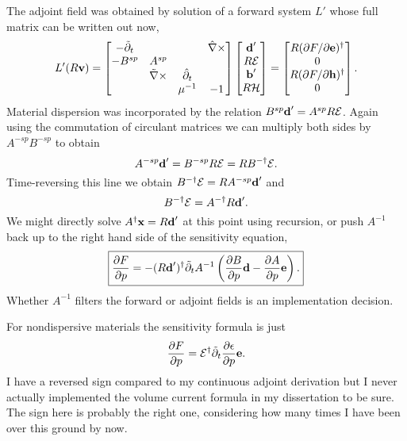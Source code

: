The adjoint field was obtained by solution of a forward system $L'$ whose full matrix can be written out now,
%
\begin{equation}
L'(R \textbf{v}) =
\begin{bmatrix}
-\tilde{\partial}_t & & & \hat{\nabla} \times \\
-B^{sp} & A^{sp} & & \\
& \tilde{\nabla} \times & \hat{\partial}_t & \\
& & \mu^{-1} & -1
\end{bmatrix}
\begin{bmatrix}
\textbf{d}' \\ R \mathcal{E} \\ \textbf{b}' \\ R \mathcal{H}
\end{bmatrix}
=
\begin{bmatrix}
R(\partial{F}/\partial{\textbf{e}})^\dagger \\
0 \\
R(\partial{F}/\partial{\textbf{h}})^\dagger \\
0
\end{bmatrix}.
\end{equation}
%
Material dispersion was incorporated by the relation $B^{sp} \textbf{d}' = A^{sp} R \mathcal{E}$.  Again using the commutation of circulant matrices we can multiply both sides by $A^{-sp} B^{-sp}$ to obtain
%
\begin{equation}
A^{-sp} \textbf{d}' = B^{-sp} R \mathcal{E} = R B^{-\dagger} \mathcal{E}.
\end{equation}
%
Time-reversing this line we obtain $B^{-\dagger} \mathcal{E} = R A^{-sp} \textbf{d}'$ and
%
\begin{equation}
B^{-\dagger} \mathcal{E} = A^{-\dagger} R \textbf{d}'.
\end{equation}
%
We might directly solve $A^\dagger \textbf{x} = R \textbf{d}'$ at this point using recursion, or push $A^{-1}$ back up to the right hand side of the sensitivity equation,
%
\begin{equation}
\boxed{
\pp{F}{p} = -(R \ve{d}')^\dagger \tilde{\partial}_t A^{-1} \left(\pp{B}{p} \ve d - \pp{A}{p} \ve e \right).
}%
\end{equation}
%
Whether $A^{-1}$ filters the forward or adjoint fields is an implementation decision.

For nondispersive materials the sensitivity formula is just
%
\begin{equation}
\frac{\partial{F}}{\partial{p}} = \mathcal{E}^\dagger \tilde{\partial}_t \frac{\partial{\epsilon}}{\partial{p}} \textbf{e}.
\end{equation}
%
I have a reversed sign compared to my continuous adjoint derivation but I never actually implemented the volume current formula in my dissertation to be sure.  The sign here is probably the right one, considering how many times I have been over this ground by now.

